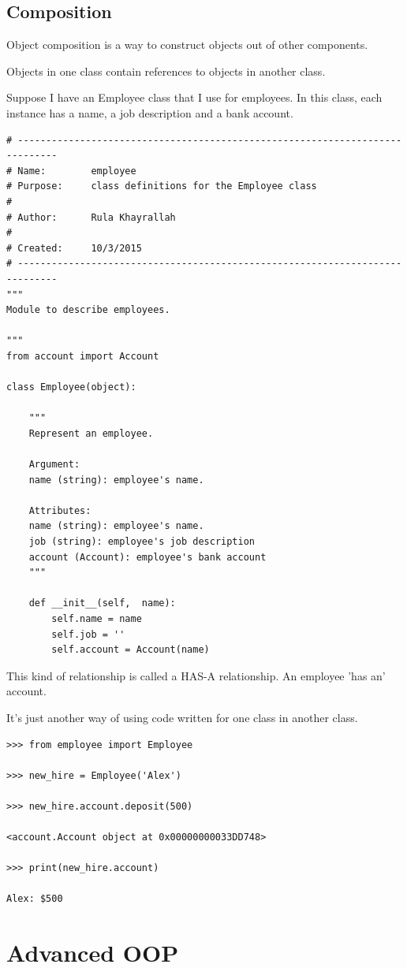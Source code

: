 \documentclass{article}
\begin{document}
\subsection{Composition}

Object composition is a way to construct  objects out of other components.  

Objects in one class contain references to objects in another class. 

Suppose I have an Employee class that I use for employees.  In this class, each instance has a name, a job description and a bank account.

\begin{lstlisting}
# -----------------------------------------------------------------------------
# Name:        employee
# Purpose:     class definitions for the Employee class
#
# Author:      Rula Khayrallah
#
# Created:     10/3/2015
# -----------------------------------------------------------------------------
"""
Module to describe employees.
 
"""
from account import Account
 
class Employee(object):
 
    """
    Represent an employee.
 
    Argument:
    name (string): employee's name.
 
    Attributes:
    name (string): employee's name.
    job (string): employee's job description
    account (Account): employee's bank account
    """
 
    def __init__(self,  name):
        self.name = name
        self.job = ''
        self.account = Account(name)
\end{lstlisting}
 
This kind of relationship is called a HAS-A relationship.
An employee 'has an' account.

It’s just another way of using code written for one class in another class.

\begin{lstlisting}
>>> from employee import Employee

>>> new_hire = Employee('Alex')

>>> new_hire.account.deposit(500)

<account.Account object at 0x00000000033DD748>

>>> print(new_hire.account)

Alex: $500
\end{lstlisting}

\section{Advanced OOP}
\end{document}
